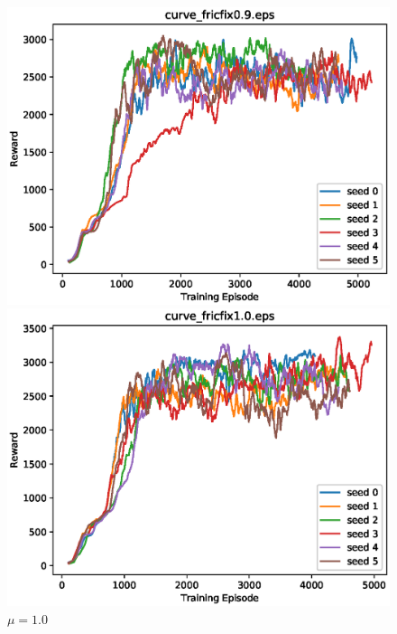 \begin{figure}[p]
 \begin{minipage}{0.49\hsize}
  \begin{center}
 \includegraphics[width=.99\linewidth]{./fig/curve_fricfix0.9.eps}
  \caption{$\mu=0.9$
  }
  \end{center}
 \end{minipage}
 \begin{minipage}{0.49\hsize}
   \begin{center}
 \includegraphics[width=.99\linewidth]{./fig/curve_fricfix1.0.eps}
  \caption{$\mu=1.0$
     }
  \end{center}
 \end{minipage}
\end{figure}

